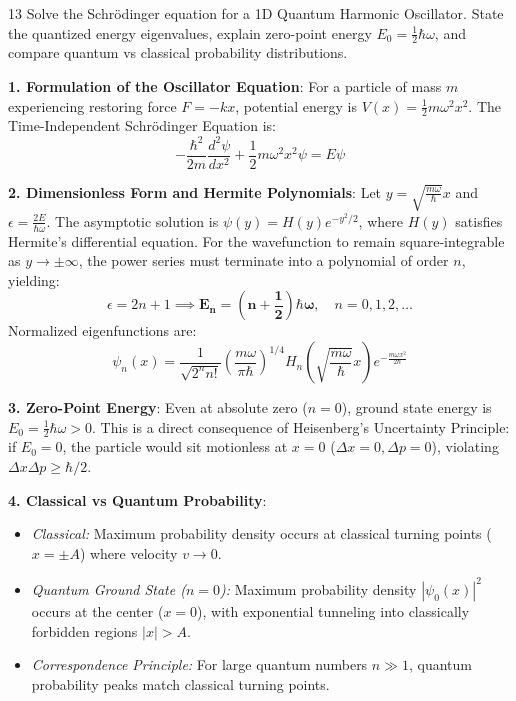 \begin{theoryq}{13}
Solve the Schrödinger equation for a 1D Quantum Harmonic Oscillator. State the quantized energy eigenvalues, explain zero-point energy $E_0 = \frac{1}{2}\hbar\omega$, and compare quantum vs classical probability distributions.
\end{theoryq}
\begin{theorysol}
\textbf{1. Formulation of the Oscillator Equation}:
For a particle of mass $m$ experiencing restoring force $F = -k x$, potential energy is $V(x) = \frac{1}{2}m\omega^2 x^2$.
The Time-Independent Schrödinger Equation is:
\begin{equation}
-\frac{\hbar^2}{2m}\frac{d^2\psi}{dx^2} + \frac{1}{2}m\omega^2 x^2 \psi = E\psi
\end{equation}

\textbf{2. Dimensionless Form and Hermite Polynomials}:
Let $y = \sqrt{\frac{m\omega}{\hbar}} x$ and $\epsilon = \frac{2E}{\hbar\omega}$.
The asymptotic solution is $\psi(y) = H(y) e^{-y^2/2}$, where $H(y)$ satisfies Hermite's differential equation.
For the wavefunction to remain square-integrable as $y \to \pm\infty$, the power series must terminate into a polynomial of order $n$, yielding:
\begin{equation}
\epsilon = 2n + 1 \implies \mathbf{E_n = \left(n + \frac{1}{2}\right)\hbar\omega},\quad n = 0, 1, 2, \dots
\end{equation}
Normalized eigenfunctions are:
\begin{equation}
\psi_n(x) = \frac{1}{\sqrt{2^n n!}}\left(\frac{m\omega}{\pi\hbar}\right)^{1/4} H_n\left(\sqrt{\frac{m\omega}{\hbar}}x\right) e^{-\frac{m\omega x^2}{2\hbar}}
\end{equation}

\textbf{3. Zero-Point Energy}:
Even at absolute zero ($n=0$), ground state energy is $E_0 = \frac{1}{2}\hbar\omega > 0$.
This is a direct consequence of Heisenberg's Uncertainty Principle: if $E_0 = 0$, the particle would sit motionless at $x=0$ ($\Delta x = 0, \Delta p = 0$), violating $\Delta x \Delta p \ge \hbar/2$.

\textbf{4. Classical vs Quantum Probability}:
\begin{itemize}
\item \textit{Classical:} Maximum probability density occurs at classical turning points ($x = \pm A$) where velocity $v \to 0$.
\item \textit{Quantum Ground State ($n=0$):} Maximum probability density $|\psi_0(x)|^2$ occurs at the center ($x=0$), with exponential tunneling into classically forbidden regions $|x| > A$.
\item \textit{Correspondence Principle:} For large quantum numbers $n \gg 1$, quantum probability peaks match classical turning points.
\end{itemize}

\end{theorysol}
\vspace{4mm}

